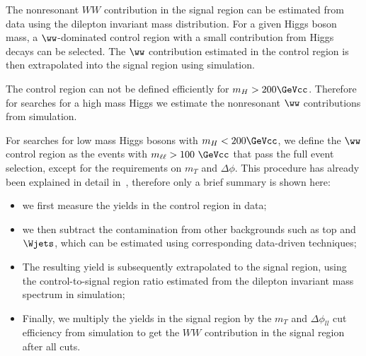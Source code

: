 The nonresonant $WW$ contribution in the signal region can be estimated from data 
using the dilepton invariant mass distribution. For a given Higgs boson mass, 
a $\ww$-dominated control region with a small contribution from Higgs decays 
can be selected. The $\ww$ contribution estimated in the control region 
is then extrapolated into the signal region using simulation. 

The control region can not be defined efficiently for $m_H>200\GeVcc$. Therefore for 
searches for a high mass Higgs we estimate the nonresonant 
$\ww$ contributions from simulation. 

For searches for low mass Higgs bosons with $m_{H}<200\GeVcc$, we define the $\ww$ control region as the events 
with $m_{\ell\ell} > 100~\GeVcc$ that pass the full event selection, except for the requirements on 
$m_T$ and $\Delta\phi$. This procedure has already been explained in detail in~\cite{HWW2011}, therefore only 
a brief summary is shown here:

\begin{itemize}
\item we first measure the yields in the control region in data; 
\item we then subtract the contamination from other backgrounds such as top and 
$\Wjets$, which can be estimated using corresponding data-driven techniques;
\item The resulting yield is subsequently extrapolated to the signal region, using 
the control-to-signal region ratio estimated from the dilepton invariant mass 
spectrum in simulation;
\item Finally, we multiply the yields in the signal region by the 
$m_T$ and $\Delta\phi_{ll}$ cut efficiency from simulation to get the 
$WW$ contribution in the signal region after all cuts.
\end{itemize}

